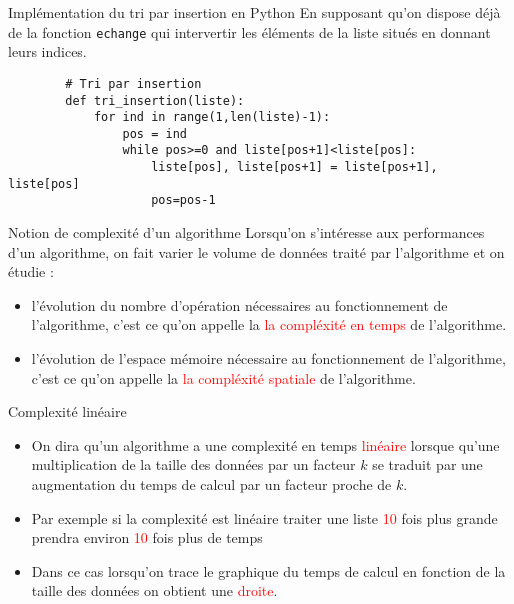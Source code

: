 \documentclass[10pt]{beamer}
\begin{document}
\begin{frame}[fragile]
	\mframe{\Algotris}
	\begin{block}{Implémentation du tri par insertion en Python}
		En supposant qu'on dispose déjà de  la fonction \texttt{echange} qui intervertir les éléments de la liste situés en donnant leurs indices.
		\begin{lstlisting}
		# Tri par insertion
		def tri_insertion(liste):
			for ind in range(1,len(liste)-1):
				pos = ind
				while pos>=0 and liste[pos+1]<liste[pos]:
					liste[pos], liste[pos+1] = liste[pos+1], liste[pos]
					pos=pos-1
		\end{lstlisting}
	\end{block}
\end{frame}

\begin{frame}
	\mframe{\Algotris}
	\begin{block}{Notion de complexité d'un algorithme}
		Lorsqu'on s'intéresse aux performances d'un algorithme, on fait varier le volume de données traité par l'algorithme et on étudie :
		\begin{itemize}
			\item<2-> l'évolution du nombre d'opération nécessaires au fonctionnement de l'algorithme, c'est ce qu'on appelle la \textcolor{red}{la compléxité en temps} de l'algorithme.
			\item<3-> l'évolution de l'espace mémoire nécessaire au fonctionnement de l'algorithme, c'est ce qu'on appelle la \textcolor{red}{la compléxité spatiale} de l'algorithme.
		\end{itemize}
	\end{block}
\end{frame}

\begin{frame}
	\mframe{\Algotris}
	\begin{block}{Complexité linéaire}
		\begin{itemize}
			\item<2-> On dira qu'un algorithme a une complexité en temps \textcolor{red}{linéaire} lorsque qu'une multiplication de la taille des données par un facteur $k$ se traduit par une augmentation du temps de calcul par un facteur proche de $k$.
			\item<3-> Par exemple si la complexité est linéaire traiter une liste \textcolor{red}{10} fois plus grande prendra environ \textcolor{red}{10} fois plus de temps
			\item<4-> Dans ce cas lorsqu'on trace le graphique du temps de calcul en fonction de la taille des données on obtient une \textcolor{red}{droite}.
		\end{itemize}
	\end{block}
\end{frame}
\end{document}
